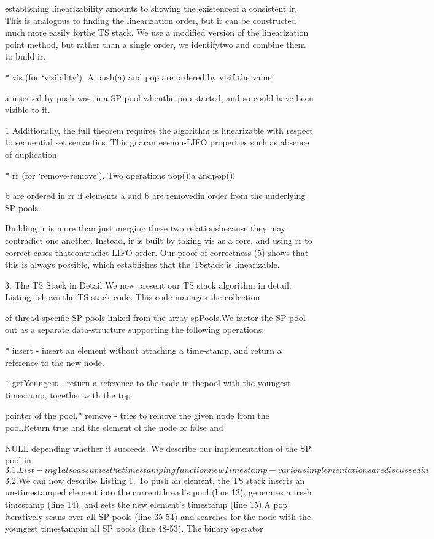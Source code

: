 establishing linearizability amounts to showing the existenceof a consistent ir. This is analogous to finding the linearization order, but ir can be constructed much more easily forthe TS stack. We use a modified version of the linearization
point method, but rather than a single order, we identifytwo and combine them to build ir.

* vis (for `visibility'). A push(a) and pop are ordered by visif the value

a inserted by push was in a SP pool whenthe pop started, and so could have been visible to it.

1 Additionally, the full theorem requires the algorithm is linearizable with respect to sequential set semantics. This guaranteesnon-LIFO properties such as absence of duplication.

* rr (for `remove-remove'). Two operations pop()!a andpop()!

b are ordered in rr if elements a and b are removedin order from the underlying SP pools.

Building ir is more than just merging these two relationsbecause they may contradict one another. Instead, ir is built
by taking vis as a core, and using rr to correct cases thatcontradict LIFO order. Our proof of correctness (5) shows
that this is always possible, which establishes that the TSstack is linearizable.

3. The TS Stack in Detail
We now present our TS stack algorithm in detail. 
Listing 1shows the TS stack code. This code manages the collection

of thread-specific SP pools linked from the array spPools.We factor the SP pool out as a separate data-structure
supporting the following operations:

* insert - insert an element without attaching a time-stamp, and return a reference to the new node.

* getYoungest - return a reference to the node in thepool with the youngest timestamp, together with the top

pointer of the pool.*
remove - tries to remove the given node from the pool.Return true and the element of the node or false and

NULL depending whether it succeeds.
We describe our implementation of the SP pool in $3.1. List-ing 1 also assumes the timestamping function newTimestamp

- various implementations are discussed in $3.2.We can now describe Listing 1. To push an element, the
TS stack inserts an un-timestamped element into the currentthread's pool (line 13), generates a fresh timestamp (line 14),
and sets the new element's timestamp (line 15).A pop iteratively scans over all SP pools (line 35-54)
and searches for the node with the youngest timestampin all SP pools (line 48-53). The binary operator

